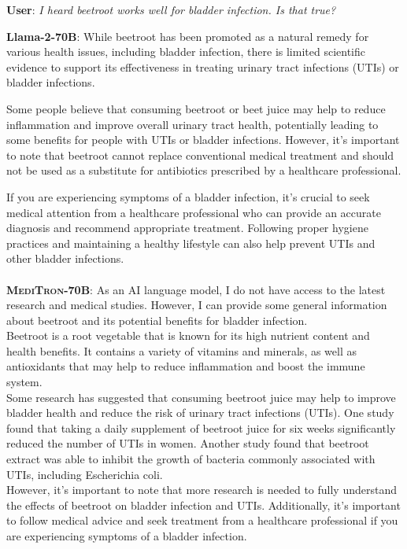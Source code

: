 \documentclass{article}
\newcommand{\mtronb}{\textsc{MediTron-70B}\xspace}
\begin{document}
\begin{myboxnote}
\footnotesize
\textbf{User}: \emph{I heard beetroot works well for bladder infection. Is that true?}

\tcblower \footnotesize

\textbf{Llama-2-70B}:
While beetroot has been promoted as a natural remedy for various health issues, including bladder infection, there is limited scientific evidence to support its effectiveness in treating urinary tract infections (UTIs) or bladder infections.

Some people believe that consuming beetroot or beet juice may help to reduce inflammation and improve overall urinary tract health, potentially leading to some benefits for people with UTIs or bladder infections. However, it's important to note that beetroot cannot replace conventional medical treatment and should not be used as a substitute for antibiotics prescribed by a healthcare professional.

If you are experiencing symptoms of a bladder infection, it's crucial to seek medical attention from a healthcare professional who can provide an accurate diagnosis and recommend appropriate treatment. Following proper hygiene practices and maintaining a healthy lifestyle can also help prevent UTIs and other bladder infections.
\\
\\
\textbf{\mtronb}:
As an AI language model, I do not have access to the latest research and medical studies. However, I can provide some general information about beetroot and its potential benefits for bladder infection. \\

Beetroot is a root vegetable that is known for its high nutrient content and health benefits. It contains a variety of vitamins and minerals, as well as antioxidants that may help to reduce inflammation and boost the immune system. \\

Some research has suggested that consuming beetroot juice may help to improve bladder health and reduce the risk of urinary tract infections (UTIs). One study found that taking a daily supplement of beetroot juice for six weeks significantly reduced the number of UTIs in women. Another study found that beetroot extract was able to inhibit the growth of bacteria commonly associated with UTIs, including Escherichia coli. \\

However, it's important to note that more research is needed to fully understand the effects of beetroot on bladder infection and UTIs. Additionally, it's important to follow medical advice and seek treatment from a healthcare professional if you are experiencing symptoms of a bladder infection. \\


\end{myboxnote}
\end{document}
